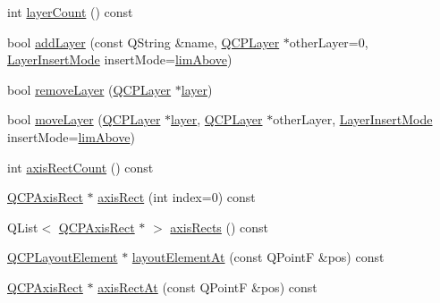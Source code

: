 \begin{DoxyCompactItemize}
\item 
int \mbox{\hyperlink{class_q_custom_plot_afa45d61e65292026f4c58c9c88c2cef0}{layer\+Count}} () const
\item 
bool \mbox{\hyperlink{class_q_custom_plot_ad5255393df078448bb6ac83fa5db5f52}{add\+Layer}} (const Q\+String \&name, \mbox{\hyperlink{class_q_c_p_layer}{Q\+C\+P\+Layer}} $\ast$other\+Layer=0, \mbox{\hyperlink{class_q_custom_plot_a75a8afbe6ef333b1f3d47abb25b9add7}{Layer\+Insert\+Mode}} insert\+Mode=\mbox{\hyperlink{class_q_custom_plot_a75a8afbe6ef333b1f3d47abb25b9add7a062b0b7825650b432a713c0df6742d41}{lim\+Above}})
\item 
bool \mbox{\hyperlink{class_q_custom_plot_a40f75e342c5eaab6a86066a42a0e2a94}{remove\+Layer}} (\mbox{\hyperlink{class_q_c_p_layer}{Q\+C\+P\+Layer}} $\ast$\mbox{\hyperlink{class_q_custom_plot_a0a96244e7773b242ef23c32b7bdfb159}{layer}})
\item 
bool \mbox{\hyperlink{class_q_custom_plot_ae896140beff19424e9e9e02d6e331104}{move\+Layer}} (\mbox{\hyperlink{class_q_c_p_layer}{Q\+C\+P\+Layer}} $\ast$\mbox{\hyperlink{class_q_custom_plot_a0a96244e7773b242ef23c32b7bdfb159}{layer}}, \mbox{\hyperlink{class_q_c_p_layer}{Q\+C\+P\+Layer}} $\ast$other\+Layer, \mbox{\hyperlink{class_q_custom_plot_a75a8afbe6ef333b1f3d47abb25b9add7}{Layer\+Insert\+Mode}} insert\+Mode=\mbox{\hyperlink{class_q_custom_plot_a75a8afbe6ef333b1f3d47abb25b9add7a062b0b7825650b432a713c0df6742d41}{lim\+Above}})
\item 
int \mbox{\hyperlink{class_q_custom_plot_a8f85940aaac50efb466287d9d2d04ec6}{axis\+Rect\+Count}} () const
\item 
\mbox{\hyperlink{class_q_c_p_axis_rect}{Q\+C\+P\+Axis\+Rect}} $\ast$ \mbox{\hyperlink{class_q_custom_plot_ae5eefcb5f6ca26689b1fd4f6e25b42f9}{axis\+Rect}} (int index=0) const
\item 
Q\+List$<$ \mbox{\hyperlink{class_q_c_p_axis_rect}{Q\+C\+P\+Axis\+Rect}} $\ast$ $>$ \mbox{\hyperlink{class_q_custom_plot_a12af771429e2d7e313c8c5d5fca068fe}{axis\+Rects}} () const
\item 
\mbox{\hyperlink{class_q_c_p_layout_element}{Q\+C\+P\+Layout\+Element}} $\ast$ \mbox{\hyperlink{class_q_custom_plot_afaa1d304e0287d140fd238e90889ef3c}{layout\+Element\+At}} (const Q\+PointF \&pos) const
\item 
\mbox{\hyperlink{class_q_c_p_axis_rect}{Q\+C\+P\+Axis\+Rect}} $\ast$ \mbox{\hyperlink{class_q_custom_plot_a4a08842fc3e9ba6bed83aa410c5c5ba5}{axis\+Rect\+At}} (const Q\+PointF \&pos) const
\item 

\end{DoxyCompactItemize}
